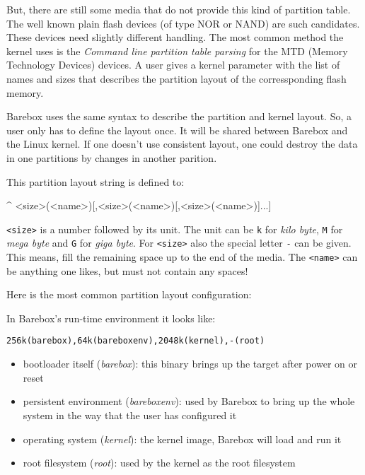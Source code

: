 But, there are still some media that do not provide this kind of partition table.
The well known plain flash devices (of type NOR or NAND) are such candidates.
These devices need slightly different handling. The most common method the
kernel uses is the \textit{Command line partition table parsing} for the MTD
(Memory Technology Devices) devices. A user gives a kernel parameter with the
list of names and sizes that describes the partition layout of the
corressponding flash memory.

%
%

Barebox uses the same syntax to describe the partition and kernel layout. So,
a user only has to define the layout once. It will be shared between Barebox
and the Linux kernel. If one doesn't use consistent layout, one could destroy
the data in one partitions by changes in another parition.

This partition layout string is defined to:

\begin{ptxshell}[escapechar=|]{^}
<size>(<name>)[,<size>(<name>)[,<size>(<name>)]...]
\end{ptxshell}

\texttt{<size>} is a number followed by its unit. The unit can be \texttt{k} for
\textit{kilo byte}, \texttt{M} for \textit{mega byte} and \texttt{G} for
\textit{giga byte}. For \texttt{<size>} also the special letter \texttt{-}
can be given. This means, fill the remaining space up to the end of the media. The
\texttt{<name>} can be anything one likes, but must not contain any spaces!

Here is the most common partition layout configuration:

In Barebox's run-time environment it looks like:

\texttt{256k(barebox),64k(bareboxenv),2048k(kernel),-(root)}

\begin{itemize}
 \item bootloader itself (\textit{barebox}): this binary brings up the target
  after power on or reset
 \item persistent environment (\textit{bareboxenv}): used by Barebox to bring up
  the whole system in the way that the user has configured it
 \item operating system (\textit{kernel}): the kernel image, Barebox will load
  and run it
 \item root filesystem (\textit{root}): used by the kernel as the root
  filesystem
\end{itemize}

